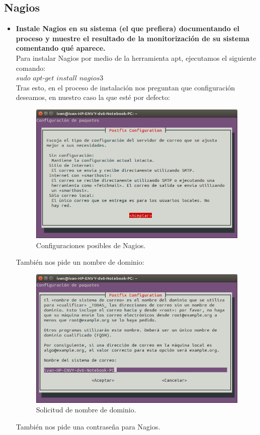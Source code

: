 \subsection{Nagios}
\begin{itemize}
	\item \textbf{Instale Nagios en su sistema (el que prefiera) documentando el
		proceso y muestre el resultado de la monitorización de su sistema comentando qué
		aparece.}\\
	Para instalar Nagios por medio de la herramienta apt, ejecutamos el siguiente comando:\\
	
	$sudo$ $apt$-$get$ $install$ $nagios3$\\
	
	Tras esto, en el proceso de instalación nos preguntan que configuración deseamos, en nuestro caso la que esté por defecto:\\
	\begin{figure}[H]
	\centering
	\includegraphics[width=0.7\linewidth]{Nagios1}
	\caption[Configuración]{Configuraciones posibles de Nagios.}
	\label{fig:Nagios1}
	\end{figure}
	
	También nos pide un nombre de dominio:\\
	\begin{figure}[H]
	\centering
	\includegraphics[width=0.7\linewidth]{Nagios2}
	\caption[nagios2]{Solicitud de nombre de dominio.}
	\label{fig:Nagios2}
	\end{figure}
	
	También nos pide una contraseña para Nagios.
	
\end{itemize}

